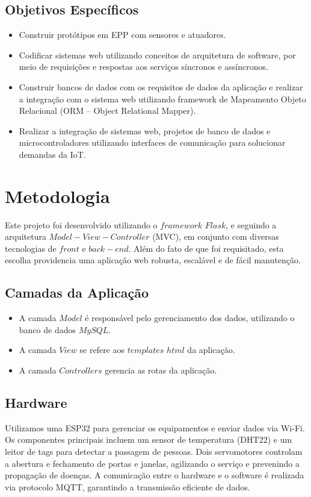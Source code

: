 \documentclass[conference, a4paper, 12pt]{IEEEtran}
\begin{document}
  \subsection{Objetivos Específicos}
\begin{itemize}
  \item Construir protótipos em
EPP com sensores e atuadores.
\item Codificar sistemas web
utilizando conceitos de
arquitetura de software, por meio
de requisições e respostas aos
serviços síncronos e assíncronos.
\item Construir bancos de dados
com os requisitos de dados da
aplicação e realizar a integração
com o sistema web utilizando
framework de Mapeamento
Objeto Relacional (ORM – Object
Relational Mapper).
\item Realizar a integração de
sistemas web, projetos de banco
de dados e microcontroladores
utilizando interfaces de
comunicação para solucionar
demandas da IoT.
\end{itemize}

\section{Metodologia}
\label{sec:metodologia}
Este projeto foi desenvolvido utilizando o $framework$ $Flask$, e seguindo a arquitetura $Model-View-Controller$ (MVC), em conjunto com diversas tecnologias de $front$ e $back-end$. Além do fato de que foi requisitado, esta escolha providencia uma aplicação web robusta, escalável e de fácil manutenção.

\subsection{Camadas da Aplicação}
\begin{itemize}
  \item A camada $Model$ é responsável pelo gerenciamento dos dados, utilizando o banco de dados $MySQL$.

  \item A camada $View$ se refere aos $templates$ $html$ da aplicação.

  \item A camada $Controllers$ gerencia as rotas da aplicação.
\end{itemize}

\subsection{Hardware}
Utilizamos uma ESP32 para gerenciar os equipamentos e enviar dados via Wi-Fi. Os componentes principais incluem um sensor de temperatura (DHT22) e um leitor de tags para detectar a passagem de pessoas. Dois servomotores controlam a abertura e fechamento de portas e janelas, agilizando o serviço e prevenindo a propagação de doenças. A comunicação entre o hardware e o software é realizada via protocolo MQTT, garantindo a transmissão eficiente de dados.
\end{document}
